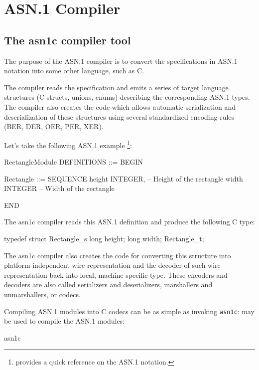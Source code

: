 \documentclass[english,oneside,12pt]{book}
\newcommand{\cmd}[1]{\texttt{#1}}
\begin{document}
\chapter{ASN.1 Compiler}

\section{The asn1c compiler tool}

The purpose of the ASN.1 compiler is to convert the specifications
in ASN.1 notation into some other language, such as C.

The compiler reads the specification and emits a series of target
language structures (C structs, unions, enums) describing the corresponding
ASN.1 types. The compiler also creates the code which allows automatic
serialization and deserialization of these structures using several
standardized encoding rules (BER, DER, OER, PER, XER).

Let's take the following ASN.1 example%
\footnote{ provides a quick reference
on the ASN.1 notation.}:
\begin{asn}
RectangleModule DEFINITIONS ::= BEGIN

Rectangle ::= SEQUENCE {
    height  INTEGER,        -- Height of the rectangle
    width   INTEGER         -- Width of the rectangle
}

END
\end{asn}
The asn1c compiler reads this ASN.1 definition and produce the following
C type:
\begin{codesample}
typedef struct Rectangle_s {
    long height;
    long width;
} Rectangle_t;
\end{codesample}
The asn1c compiler also creates the code for converting this structure into
platform-independent wire representation and the decoder
of such wire representation back into local, machine-specific type.
These encoders and decoders are also called serializers and deserializers,
marshallers and unmarshallers, or codecs.

Compiling ASN.1 modules into C codecs can be as simple as invoking \cmd{asn1c}:
may be used to compile the ASN.1 modules:
\begin{bash}
asn1c %
\end{bash}
\end{document}
